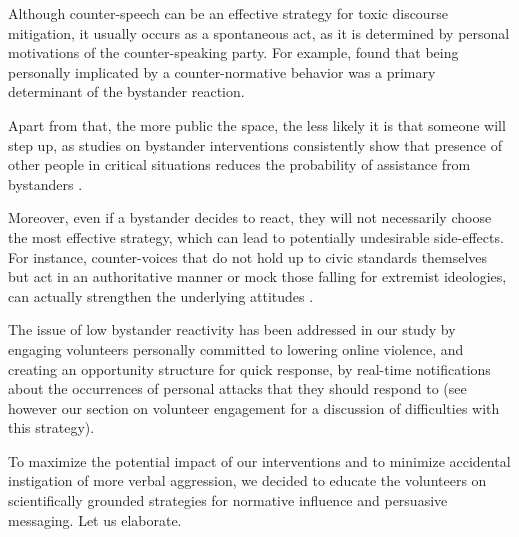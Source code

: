 \documentclass[preprint,12pt]{elsarticle}
\begin{document}
Although counter-speech can be an effective strategy for toxic discourse mitigation, it usually occurs as a spontaneous act, as it is determined by personal motivations of the counter-speaking party. For example, \citet{brauer2010descriptive} found that being personally implicated by a counter-normative behavior was a primary determinant of the bystander reaction. 

Apart from that, the more public the space, the less likely it is that someone will step up, as studies on bystander interventions consistently show that presence of other people in critical situations reduces the probability of assistance from bystanders \citep{fischer2011bystander}. %

Moreover, even if a bystander decides to react, they will not necessarily choose the most effective strategy, which can lead to potentially undesirable side-effects. For instance,  counter-voices that do not hold up to civic standards themselves but act in an authoritative manner or mock those falling for extremist ideologies, can actually strengthen the underlying attitudes \citep{ziegele2018journalistic, schieb2016governing, legault2011ironic}.

The issue of low bystander reactivity has been addressed in our study by engaging volunteers personally committed to lowering online violence, and creating an opportunity structure for quick response, by real-time notifications about the occurrences of personal attacks that they should respond to (see however our section on volunteer engagement for a discussion of difficulties with this strategy).

To maximize the potential impact of our interventions and to minimize  accidental instigation of more verbal aggression, we decided to educate the volunteers on scientifically grounded strategies for normative influence and persuasive messaging.  Let us elaborate.
\end{document}
